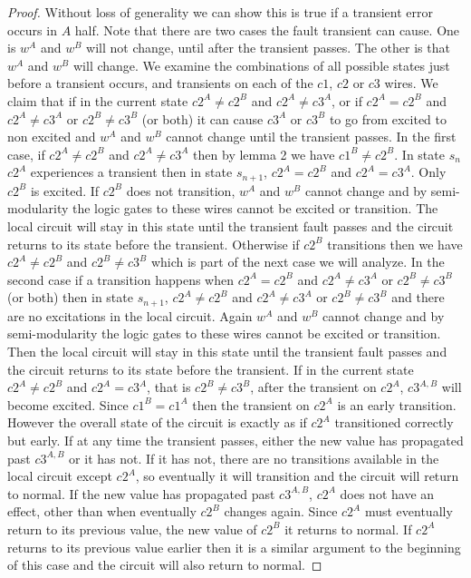 \documentclass{article}
\begin{document}
\begin{proof}
Without loss of generality we can show this is true if a transient error occurs in $A$ half.  %
Note that there are two cases the fault transient can cause.  One is $w^A$ and $w^B$ will not change, until after the transient passes.  The other is that $w^A$ and $w^B$ will change. \newline
We examine the combinations of all possible states just before a transient occurs, and transients on each of the $c1$, $c2$ or $c3$ wires.  We claim that if in the current state $c2^A \neq c2^B$ and $c2^A \neq c3^A$, or if $c2^A=c2^B$ and $c2^A\neq c3^A$ or $c2^B\neq c3^B$ (or both) it can cause $c3^A$ or $c3^B$ to go from excited to non excited and $w^A$ and $w^B$ cannot change until the transient passes.  In the first case, if $c2^A \neq c2^B$ and $c2^A \neq c3^A$ then by lemma 2 we have $c1^B\neq c2^B$.
 In state $s_n$ $c2^A$ experiences a transient then in state $s_{n+1}$, $c2^A=c2^B$ and $c2^A=c3^A$.  Only $c2^B$ is excited.  If $c2^B$ does not transition, $w^A$ and $w^B$ cannot change and by semi-modularity the logic gates to these wires cannot be excited or transition. The local circuit will stay in this state until the transient fault passes and the circuit returns to its state before the transient.  Otherwise if $c2^B$ transitions then we have $c2^A\neq c2^B$ and $c2^B \neq c3^B$ which is part of the next case we will analyze.
In the second case if a transition happens when $c2^A=c2^B$ and $c2^A\neq c3^A$ or $c2^B\neq c3^B$ (or both) then in state $s_{n+1}$, $c2^A\neq c2^B$ and $c2^A\neq c3^A$ or $c2^B\neq c3^B$ and there are no excitations in the local circuit.  Again $w^A$ and $w^B$ cannot change and by semi-modularity the logic gates to these wires cannot be excited or transition.  Then the local circuit will stay in this state until the transient fault passes and the circuit returns to its state before the transient. \newline
If in the current state $c2^A\neq c2^B$ and $c2^A= c3^A$, that is $c2^B\neq c3^B$, after the transient on $c2^A$, $c3^{A,B}$ will become excited.  Since $c1^B=c1^A$ then the transient on $c2^A$ is an early transition.  However the overall state of the circuit is exactly as if $c2^A$ transitioned correctly but early.  If at any time the transient passes, either the new value has propagated past $c3^{A,B}$ or it has not.  If it has not, there are no transitions available in the local circuit except $c2^A$, so eventually it will transition and the circuit will return to normal.  If the new value has propagated past $c3^{A,B}$, $c2^A$ does not have an effect, other than when eventually $c2^B$ changes again. Since $c2^A$ must eventually return to its previous value, the new value of $c2^B$ it returns to normal.  If $c2^A$ returns to its previous value earlier then it is a similar argument to the beginning of this case and the circuit will also return to normal.

\end{proof}
\end{document}
